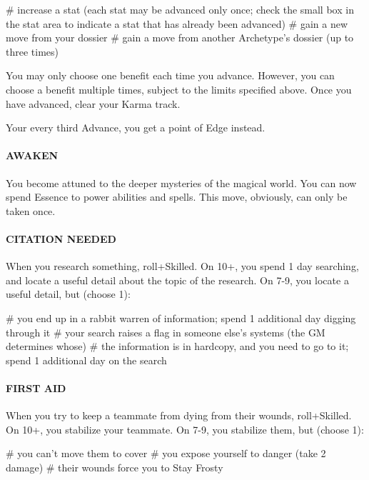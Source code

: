 \begin{easylist}
# increase a stat (each stat may be advanced only once; check the small box in the stat area to indicate a stat that has already been advanced)
# gain a new move from your dossier
# gain a move from another Archetype’s dossier (up to three times)
\end{easylist}

You may only choose one benefit each time you advance. However, you can choose a benefit multiple times, subject to the limits specified above. Once you have advanced, clear your Karma track.

Your every third Advance, you get a point of Edge instead.


\paragraph{AWAKEN}
You become attuned to the deeper mysteries of the magical world. You can now spend Essence to power abilities and spells. This move, obviously, can only be taken once.


\paragraph{CITATION NEEDED}
When you research something, roll+Skilled. On 10+, you spend 1 day searching, and locate a useful detail about the topic of the research. On 7-9, you locate a useful detail, but (choose 1):

\begin{easylist}
# you end up in a rabbit warren of information; spend 1 additional day digging through it
# your search raises a flag in someone else’s systems (the GM determines whose)
# the information is in hardcopy, and you need to go to it; spend 1 additional day on the search
\end{easylist}


\paragraph{FIRST AID}
When you try to keep a teammate from dying from their wounds, roll+Skilled. On 10+, you stabilize your teammate. On 7-9, you stabilize them, but (choose 1):

\begin{easylist}
# you can’t move them to cover
# you expose yourself to danger (take 2 damage)
# their wounds force you to Stay Frosty
\end{easylist}

